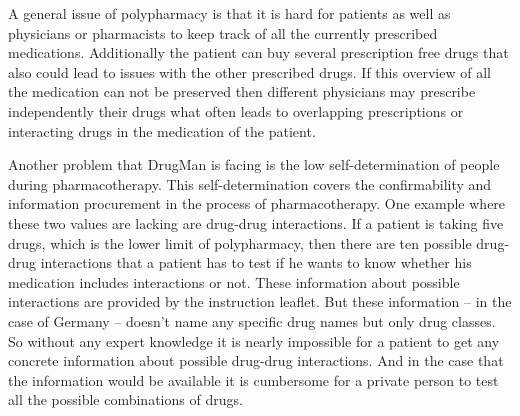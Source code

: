 A general issue of polypharmacy is that it is hard for patients as well as physicians or pharmacists to keep track of all the currently prescribed medications.
Additionally the patient can buy several prescription free drugs that also could lead to issues with the other prescribed drugs.
If this overview of all the medication can not be preserved then different physicians may prescribe independently their drugs what often leads to overlapping prescriptions or interacting drugs in the medication of the patient.

Another problem that DrugMan is facing is the low self-determination of people during pharmacotherapy.
This self-determination covers the confirmability and information procurement in the process of pharmacotherapy.
One example where these two values are lacking are drug-drug interactions.
If a patient is taking five drugs, which is the lower limit of polypharmacy, then there are ten possible drug-drug interactions that a patient has to test if he wants to know whether his medication includes interactions or not.
These information about possible interactions are provided by the instruction leaflet.
But these information -- in the case of Germany -- doesn't name any specific drug names but only drug classes.
So without any expert knowledge it is nearly impossible for a patient to get any concrete information about possible drug-drug interactions.
And in the case that the information would be available it is cumbersome for a private person to test all the possible combinations of drugs.

